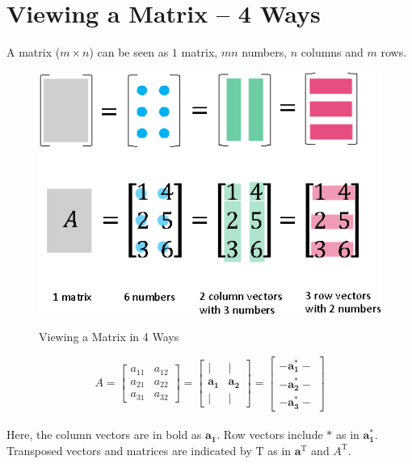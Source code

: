 \documentclass[letterpaper]{article}
\DeclareRobustCommand\transp{^{\mathrm{T}}}
\begin{document}
\tableofcontents

\section{Viewing a Matrix -- 4 Ways}

A matrix ($m \times n$) can be seen as $1$ matrix, $mn$ numbers, $n$ columns and $m$ rows.

\begin{figure}[H]
  \centering
  \includegraphics[scale=0.8]{ViewingMatrix-4Ways.eps}\\
    \caption{Viewing a Matrix in 4 Ways}
\end{figure}


\begin{equation*}
  A= \begin{bmatrix}
    a_{11} & a_{12}\\
    a_{21} & a_{22}\\
    a_{31} & a_{32}
  \end{bmatrix}
  =
  \begin{bmatrix}
    | & |\\
    \bm{a_1} & \bm{a_2}\\
    | & |
  \end{bmatrix}
  =
  \begin{bmatrix}
    - \bm{a_1^*} -\\
    - \bm{a_2^*} -\\
    - \bm{a_3^*} -
  \end{bmatrix}
\end{equation*} \\

Here, the column vectors are in bold as $\bm{a_1}$.
Row vectors include $\bm{*}$ as in $\bm{a_1^*}$.
Transposed vectors and matrices are indicated by $\mathrm{T}$ as
in $\bm{a}\transp$ and $A\transp$.
\end{document}
